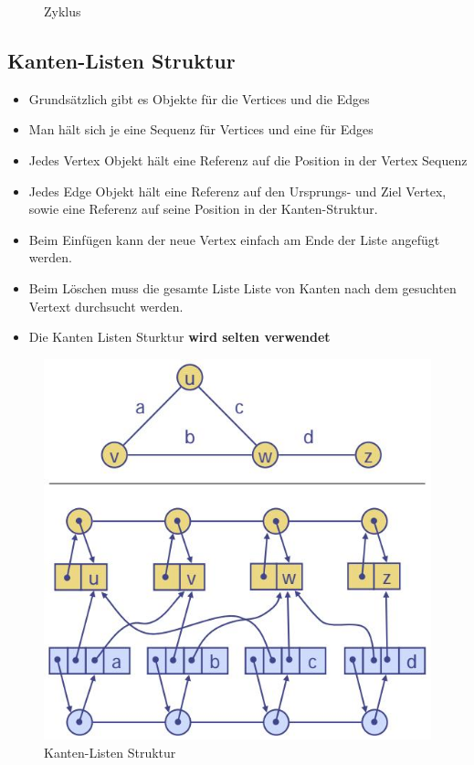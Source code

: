 \begin{figure}[ht!]
\begin{minipage}[t]{0.4\textwidth}
		\caption{Zyklus}
		\label{fig:graphzyklus}
	\end{minipage}
\end{figure}

\clearpage

\subsection{Kanten-Listen Struktur}
\begin{itemize}
	\item Grundsätzlich gibt es Objekte für die Vertices und die Edges
	\item Man hält sich je eine Sequenz für Vertices und eine für Edges
	\item Jedes Vertex Objekt hält eine Referenz auf die Position in der Vertex Sequenz
	\item Jedes Edge Objekt hält eine Referenz auf den Ursprungs- und Ziel Vertex, sowie eine Referenz auf seine Position in der Kanten-Struktur.
	\item Beim Einfügen kann der neue Vertex einfach am Ende der Liste angefügt werden. 
	\item Beim Löschen muss die gesamte Liste Liste von Kanten nach dem gesuchten Vertext durchsucht werden. 
	\item Die Kanten Listen Sturktur \textbf{wird selten verwendet}
\end{itemize}
\begin{figure}[h!]
\centering
\includegraphics[width=0.5\linewidth]{images/graph_kanten_listen}
\caption{Kanten-Listen Struktur}
\label{fig:graphkantenlisten}
\end{figure}

